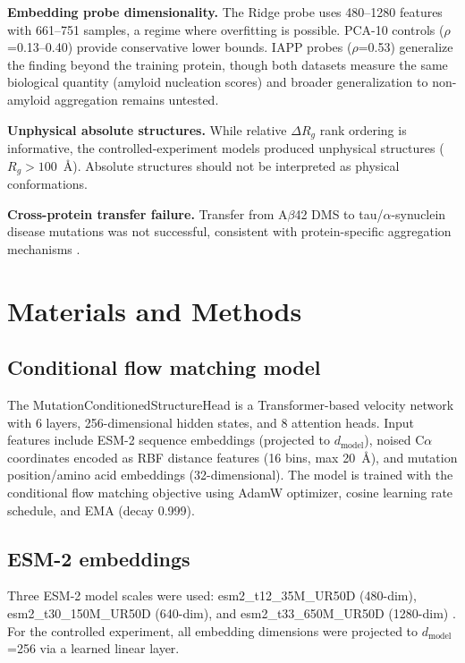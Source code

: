 \documentclass[10pt,letterpaper]{article}
\begin{document}
\textbf{Embedding probe dimensionality.} The Ridge probe uses 480--1280 features with 661--751 samples, a regime where overfitting is possible. PCA-10 controls ($\rho$=0.13--0.40) provide conservative lower bounds. IAPP probes ($\rho$=0.53) generalize the finding beyond the training protein, though both datasets measure the same biological quantity (amyloid nucleation scores) and broader generalization to non-amyloid aggregation remains untested.

\textbf{Unphysical absolute structures.} While relative $\Delta R_g$ rank ordering is informative, the controlled-experiment models produced unphysical structures ($R_g > 100$~\AA{}). Absolute structures should not be interpreted as physical conformations.

\textbf{Cross-protein transfer failure.} Transfer from A$\beta$42 DMS to tau/$\alpha$-synuclein disease mutations was not successful, consistent with protein-specific aggregation mechanisms \cite{badia2026}.

\section*{Materials and Methods}

\subsection*{Conditional flow matching model}

The MutationConditionedStructureHead is a Transformer-based velocity network with 6 layers, 256-dimensional hidden states, and 8 attention heads. Input features include ESM-2 sequence embeddings (projected to $d_{\text{model}}$), noised C$\alpha$ coordinates encoded as RBF distance features (16 bins, max 20~\AA), and mutation position/amino acid embeddings (32-dimensional). The model is trained with the conditional flow matching objective \cite{lipman2023} using AdamW optimizer, cosine learning rate schedule, and EMA (decay 0.999).

\subsection*{ESM-2 embeddings}

Three ESM-2 model scales were used: esm2\_t12\_35M\_UR50D (480-dim), esm2\_t30\_150M\_UR50D (640-dim), and esm2\_t33\_650M\_UR50D (1280-dim) \cite{lin2023}. For the controlled experiment, all embedding dimensions were projected to $d_{\text{model}}$=256 via a learned linear layer.
\end{document}
